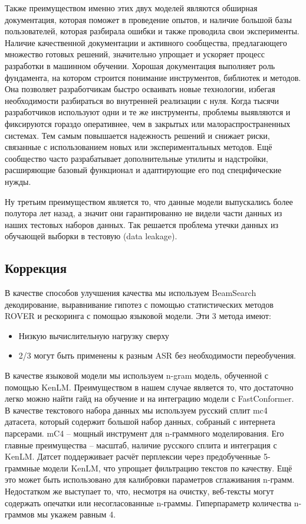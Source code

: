 Также преимуществом именно этих двух моделей являются обширная документация, которая поможет в проведение опытов, и наличие большой базы пользователей, которая разбирала ошибки и также проводила свои эксперименты.
Наличие качественной документации и активного сообщества, предлагающего множество готовых решений, значительно упрощает и ускоряет процесс разработки в машинном обучении. Хорошая документация выполняет роль фундамента, на котором строится понимание инструментов, библиотек и методов. Она позволяет разработчикам быстро осваивать новые технологии, избегая необходимости разбираться во внутренней реализации с нуля.
Когда тысячи разработчиков используют одни и те же инструменты, проблемы выявляются и фиксируются гораздо оперативнее, чем в закрытых или малораспространенных системах.
Тем самым повышается надежность решений и снижает риски, связанные с использованием новых или экспериментальных методов.
Ещё сообщество часто разрабатывает дополнительные утилиты и надстройки, расширяющие базовый функционал и адаптирующие его под специфические нужды.

Ну третьим преимуществом является то, что данные модели выпускались более полутора лет назад, а значит они гарантированно не видели части данных из наших тестовых наборов данных.
Так решается проблема утечки данных из обучающей выборки в тестовую (data leakage).

\subsection{Коррекция}

В качестве способов улучшения качества мы используем BeamSearch декодирование, выравнивание гипотез с помощью статистических методов ROVER и рескоринга с помощью языковой модели.
Эти 3 метода имеют:
\begin{itemize}
  \item Низкую вычислительную нагрузку сверху
  \item 2/3 могут быть применены к разным ASR без необходимости переобучения.
\end{itemize}

В качестве языковой модели мы используем n-gram модель, обученной с помощью KenLM\cite{heafield2011kenlm}.
Преимуществом в нашем случае является то, что достаточно легко можно найти гайд на обучение и на интеграцию модели с FastConformer.
В качестве текстового набора данных мы используем русский сплит mc4 датасета, который содержит большой набор данных, собраный с интернета парсерами.
mC4\cite{xue2020mt5,raffel2020exploring} -- мощный инструмент для n-граммного моделирования.
Его главные преимущества -- масштаб, наличие русского сплита и интеграция с KenLM.
Датсет поддерживает расчёт перплексии через предобученные 5-граммные модели KenLM, что упрощает фильтрацию текстов по качеству.
Ещё это может быть использовано для калибровки параметров сглаживания n-грамм.
Недостатком же выступает то, что, несмотря на очистку, веб-тексты могут содержать опечатки или несогласованные n-граммы.
Гиперпараметр количества n-граммов мы укажем равным 4.

